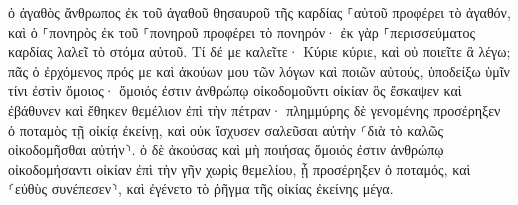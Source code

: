 \documentclass{openreader}
\begin{document}
ὁ ἀγαθὸς ἄνθρωπος ἐκ τοῦ ἀγαθοῦ θησαυροῦ τῆς καρδίας ⸀αὐτοῦ προφέρει τὸ ἀγαθόν, καὶ ὁ ⸀πονηρὸς ἐκ τοῦ ⸀πονηροῦ προφέρει τὸ πονηρόν· ἐκ γὰρ ⸀περισσεύματος καρδίας λαλεῖ τὸ στόμα αὐτοῦ. 
Τί δέ με καλεῖτε· Κύριε κύριε, καὶ οὐ ποιεῖτε ἃ λέγω; 
πᾶς ὁ ἐρχόμενος πρός με καὶ ἀκούων μου τῶν λόγων καὶ ποιῶν αὐτούς, ὑποδείξω ὑμῖν τίνι ἐστὶν ὅμοιος· 
ὅμοιός ἐστιν ἀνθρώπῳ οἰκοδομοῦντι οἰκίαν ὃς ἔσκαψεν καὶ ἐβάθυνεν καὶ ἔθηκεν θεμέλιον ἐπὶ τὴν πέτραν· πλημμύρης δὲ γενομένης προσέρηξεν ὁ ποταμὸς τῇ οἰκίᾳ ἐκείνῃ, καὶ οὐκ ἴσχυσεν σαλεῦσαι αὐτὴν ⸂διὰ τὸ καλῶς οἰκοδομῆσθαι αὐτήν⸃. 
ὁ δὲ ἀκούσας καὶ μὴ ποιήσας ὅμοιός ἐστιν ἀνθρώπῳ οἰκοδομήσαντι οἰκίαν ἐπὶ τὴν γῆν χωρὶς θεμελίου, ᾗ προσέρηξεν ὁ ποταμός, καὶ ⸂εὐθὺς συνέπεσεν⸃, καὶ ἐγένετο τὸ ῥῆγμα τῆς οἰκίας ἐκείνης μέγα. 
\end{document}
